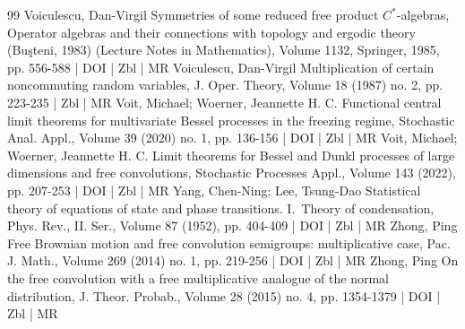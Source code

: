 \begin{thebibliography}{99}
Voiculescu, Dan-Virgil Symmetries of some reduced free product ${C}^\ast $-algebras, Operator algebras and their connections with topology and ergodic theory (Buşteni, 1983) (Lecture Notes in Mathematics), Volume 1132, Springer, 1985, pp. 556-588 | DOI | Zbl | MR
Voiculescu, Dan-Virgil Multiplication of certain noncommuting random variables, J. Oper. Theory, Volume 18 (1987) no. 2, pp. 223-235 | Zbl | MR
Voit, Michael; Woerner, Jeannette H. C. Functional central limit theorems for multivariate Bessel processes in the freezing regime, Stochastic Anal. Appl., Volume 39 (2020) no. 1, pp. 136-156 | DOI | Zbl | MR
Voit, Michael; Woerner, Jeannette H. C. Limit theorems for Bessel and Dunkl processes of large dimensions and free convolutions, Stochastic Processes Appl., Volume 143 (2022), pp. 207-253 | DOI | Zbl | MR
Yang, Chen-Ning; Lee, Tsung-Dao Statistical theory of equations of state and phase transitions. I. Theory of condensation, Phys. Rev., II. Ser., Volume 87 (1952), pp. 404-409 | DOI | Zbl | MR
Zhong, Ping Free Brownian motion and free convolution semigroups: multiplicative case, Pac. J. Math., Volume 269 (2014) no. 1, pp. 219-256 | DOI | Zbl | MR
Zhong, Ping On the free convolution with a free multiplicative analogue of the normal distribution, J. Theor. Probab., Volume 28 (2015) no. 4, pp. 1354-1379 | DOI | Zbl | MR
\end{thebibliography}

